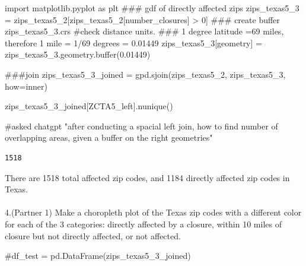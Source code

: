 \documentclass[
  letterpaper,
  DIV=11,
  numbers=noendperiod]{scrartcl}
\makeatletter
\let\oldparagraph\paragraph
\renewcommand{\paragraph}{
    \@ifstar
      \xxxParagraphStar
      \xxxParagraphNoStar
  }
\newcommand{\xxxParagraphStar}[1]{\oldparagraph*{#1}\mbox{}}
\newcommand{\xxxParagraphNoStar}[1]{\oldparagraph{#1}\mbox{}}
\newenvironment{Shaded}{\begin{snugshade}}{\end{snugshade}}
\newcommand{\AlertTok}[1]{\textcolor[rgb]{0.68,0.00,0.00}{#1}}
\newcommand{\BuiltInTok}[1]{\textcolor[rgb]{0.00,0.23,0.31}{#1}}
\newcommand{\CommentTok}[1]{\textcolor[rgb]{0.37,0.37,0.37}{#1}}
\newcommand{\DecValTok}[1]{\textcolor[rgb]{0.68,0.00,0.00}{#1}}
\newcommand{\FloatTok}[1]{\textcolor[rgb]{0.68,0.00,0.00}{#1}}
\newcommand{\ImportTok}[1]{\textcolor[rgb]{0.00,0.46,0.62}{#1}}
\newcommand{\NormalTok}[1]{\textcolor[rgb]{0.00,0.23,0.31}{#1}}
\newcommand{\OperatorTok}[1]{\textcolor[rgb]{0.37,0.37,0.37}{#1}}
\newcommand{\StringTok}[1]{\textcolor[rgb]{0.13,0.47,0.30}{#1}}
\makeatother
\begin{document}
\begin{Shaded}
\begin{Highlighting}[]
\ImportTok{import}\NormalTok{ matplotlib.pyplot }\ImportTok{as}\NormalTok{ plt}
\CommentTok{\#\#\# gdf of directly affected zips}
\NormalTok{zips\_texas5\_3 }\OperatorTok{=}\NormalTok{ zips\_texas5\_2[zips\_texas5\_2[}\StringTok{\textquotesingle{}number\_closures\textquotesingle{}}\NormalTok{] }\OperatorTok{\textgreater{}} \DecValTok{0}\NormalTok{]}
\CommentTok{\#\#\# create buffer}
\NormalTok{zips\_texas5\_3.crs }\CommentTok{\#check distance units.   }\AlertTok{\#\#\#}\CommentTok{ 1 degree latitude =69 miles, therefore 1 mile =  1/69 degrees = 0.01449}
\NormalTok{zips\_texas5\_3[}\StringTok{\textquotesingle{}geometry\textquotesingle{}}\NormalTok{] }\OperatorTok{=}\NormalTok{ zips\_texas5\_3.geometry.}\BuiltInTok{buffer}\NormalTok{(}\FloatTok{0.01449}\NormalTok{)}

\CommentTok{\#\#\#join}
\NormalTok{zips\_texas5\_3\_joined }\OperatorTok{=}\NormalTok{ gpd.sjoin(zips\_texas5\_2, zips\_texas5\_3, how}\OperatorTok{=}\StringTok{\textquotesingle{}inner\textquotesingle{}}\NormalTok{)}

\NormalTok{zips\_texas5\_3\_joined[}\StringTok{\textquotesingle{}ZCTA5\_left\textquotesingle{}}\NormalTok{].nunique()}

\CommentTok{\#asked chatgpt "after conducting a spacial left join, how to find number of overlapping areas, given a buffer on the right geometries"}
\end{Highlighting}
\end{Shaded}

\begin{verbatim}
1518
\end{verbatim}

There are 1518 total affected zip codes, and 1184 directly affected zip
codes in Texas.

\paragraph{4.(Partner 1) Make a choropleth plot of the Texas zip codes
with a different color for each of the 3 categories: directly affected
by a closure, within 10 miles of closure but not directly affected, or
not
affected.}\label{partner-1-make-a-choropleth-plot-of-the-texas-zip-codes-with-a-different-color-for-each-of-the-3-categories-directly-affected-by-a-closure-within-10-miles-of-closure-but-not-directly-affected-or-not-affected.}

\begin{Shaded}
\begin{Highlighting}[]
\CommentTok{\#df\_test = pd.DataFrame(zips\_texas5\_3\_joined)}
\end{Highlighting}
\end{Shaded}
\end{document}
